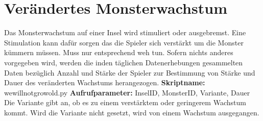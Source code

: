 \section {Ver{\"a}ndertes Monsterwachstum}
Das Monsterwachstum auf einer Insel wird stimuliert oder ausgebremst. Eine
Stimulation kann daf{\"u}r sorgen das die Spieler sich verst{\"a}rkt um die
Monster k{\"u}mmern m{\"u}ssen. Muss nur entsprechend weh tun. \newline Sofern
nichts anderes vorgegeben wird, werden die inden t{\"a}glichen Datenerhebungen
gesammelten Daten bez{\"u}glich Anzahl und St{\"a}rke der Spieler zur Bestimmung
von St{\"a}rke und Dauer des ver{\"a}nderten Wachstums herangezogen.
\newline\newline
\textbf{Skriptname:}
wewillnotgrowold.py 
\newline\newline
\textbf{Aufrufparameter:} InselID, MonsterID, Variante, Dauer
\newline\newline
Die Variante gibt an, ob es zu einem verst{\"a}rktem oder geringerem Wachstum
kommt. Wird die Variante nicht gesetzt, wird von einem Wachstum ausgegangen.
